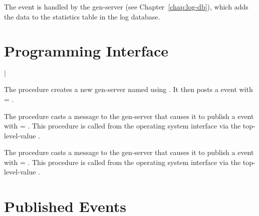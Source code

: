 The  event is handled by the 
gen-server (see Chapter~\ref{chap:log-db}), which adds the data to the
statistics table in the log database.

\section {Programming Interface}

\begin{procedure}
\end{procedure}
\returns{}
 $|$

The  procedure creates a new gen-server
named  using . It
then posts a  event with  =
.

\begin{procedure}
\end{procedure}

The  procedure casts a message to the
 gen-server that causes it to publish a
 event with  = . This
procedure is called from the operating system interface via the
top-level-value .

\begin{procedure}
\end{procedure}

The  procedure casts a message to the
 gen-server that causes it to publish a
 event with  = .  This
procedure is called from the operating system interface via the
top-level-value .

\section {Published Events}

